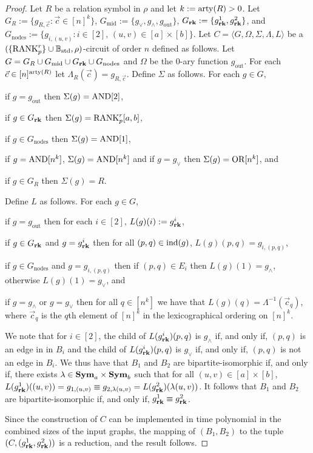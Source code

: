 \documentclass[../main/thesis.tex]{subfiles}
\begin{document}
\begin{proof}
  Let $R$ be a relation symbol in $\rho$ and let $k := \mathrm{arty}(R) > 0$. Let $G_{R}
  := \{g_{R, \vec{c}} : \vec{c} \in [n]^k\}$, $G_{\text{mid}} := \{g_{\lor},
  g_{\land}, g_{\text{out}} \}$, $G_{\text{\textbf{rk}}} : = \{ g^1_{\text{\textbf{rk}}}, g^2_{\text{\textbf{rk}}}\}$,
  and $G_{\text{nodes}} := \{g_{i, (u,v)} : i \in [2] ,\, (u,v) \in [a] \times
  [b] \}$. Let $C = \langle G, \Omega, \Sigma, \Lambda, L \rangle$ be a
  $(\{\text{\upshape RANK}^{r}_p\} \cup \mathbb{B}_{\text{std}}, \rho)$-circuit of order $n$ defined as follows.
  Let $G = G_R \cup G_{\text{mid}} \cup G_{\text{\textbf{rk}}} \cup G_{\text{nodes}}$ and
  $\Omega$ be the $0$-ary function $g_{\text{out}}$. For each $\vec{c} \in
  [n]^{\mathrm{arty}(R)}$ let $\Lambda_R(\vec{c}) = g_{R, \vec{c}}$. Define $\Sigma$ as
  follows. For each $g \in G$,
  \begin{myitemize}
  \item if $g = g_{\text{out}}$ then $\Sigma(g) = \text{\upshape AND}[2]$,
  \item if $g \in G_{\text{\textbf{rk}}}$ then $\Sigma(g) = \text{\upshape RANK}^r_p [a,b]$,
  \item if $g \in G_{\text{nodes}}$ then $\Sigma(g) = \text{\upshape AND}[1]$,
  \item if $g = \text{\upshape AND}[n^k]$, $\Sigma (g) = \text{\upshape AND}[n^k]$ and if $g = g_{\lor}$ then
    $\Sigma(g) = \text{\upshape OR}[n^k]$, and
  \item if $g \in G_R$ then $\Sigma(g) = R$.
  \end{myitemize}
  Define $L$ as follows. For each $g \in G$,
  \begin{myitemize}
    \setlength\itemsep{0mm}
  \item if $g = g_{\text{out}}$ then for each $i \in [2]$, $L(g)(i) :=
    g^i_{\text{\textbf{rk}}}$,
  \item if $g \in G_{\text{\textbf{rk}}}$ and $g = g^i_{\text{\textbf{rk}}}$ then for all $(p,q) \in
    \text{\upshape ind}(g)$, $L(g)(p,q) = g_{i, (p,q)}$,
  \item if $g \in G_{\text{nodes}}$ and $g = g_{i, (p,q)}$ then if $(p, q) \in
    E_i$ then $L(g)(1) = g_{\land}$, otherwise $L(g)(1) = g_\lor$, and
  \item if $g = g_\land$ or $g = g_\lor$ then for all $q \in [n^k]$ we have that
    $L(g)(q) =\Lambda^{-1}(\vec{c}_q)$, where $\vec{c}_q$ is the $q$th element
    of $[n]^k$ in the lexicographical ordering on $[n]^k$.
  \end{myitemize}

  We note that for $i \in [2]$, the child of $L(g^i_{\text{\textbf{rk}}})(p,q)$ is $g_\land$
  if, and only if, $(p,q)$ is an edge in in $B_i$ and the child of
  $L(g^i_{\text{\textbf{rk}}})(p,q) $ is $g_\lor$ if, and only if, $(p,q)$ is not an edge in
  $B_i$. We thus have that $B_1$ and $B_2$ are bipartite-isomorphic if, and only
  if, there exists $\lambda \in \text{\textbf{Sym}}_{a} \times \text{\textbf{Sym}}_{b}$ such that for all
  $(u,v) \in [a] \times [b]$, $L(g^1_{\text{\textbf{rk}}})((u,v)) = g_{1, (u,v)} \equiv g_{2,
    \lambda (u,v)} = L(g^2_{\text{\textbf{rk}}})(\lambda (u,v))$. It follows that $B_1$ and
  $B_2$ are bipartite-isomorphic if, and only if, $g^1_{\text{\textbf{rk}}} \equiv
  g^2_{\text{\textbf{rk}}}$.

  Since the construction of $C$ can be implemented in time polynomial in the
  combined sizes of the input graphs, the mapping of $(B_1, B_2)$ to the tuple
  $(C, (g^1_{\text{\textbf{rk}}}, g^2_{\text{\textbf{rk}}}))$ is a reduction, and the result follows.
\end{proof}
\end{document}
